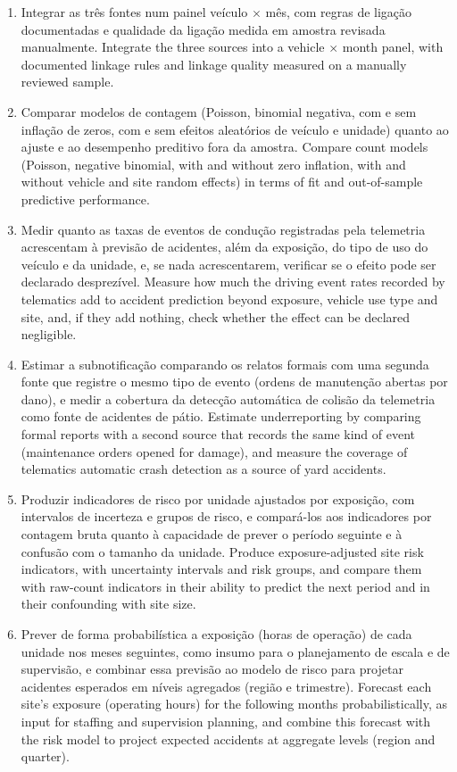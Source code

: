\begin{enumerate}[label=(\alph*)]
  \item \tr%
    {Integrar as três fontes num painel veículo $\times$ mês, com regras de ligação documentadas e qualidade da ligação medida em amostra revisada manualmente.}%
    {Integrate the three sources into a vehicle $\times$ month panel, with documented linkage rules and linkage quality measured on a manually reviewed sample.}
  \item \tr%
    {Comparar modelos de contagem (Poisson, binomial negativa, com e sem inflação de zeros, com e sem efeitos aleatórios de veículo e unidade) quanto ao ajuste e ao desempenho preditivo fora da amostra.}%
    {Compare count models (Poisson, negative binomial, with and without zero inflation, with and without vehicle and site random effects) in terms of fit and out-of-sample predictive performance.}
  \item \tr%
    {Medir quanto as taxas de eventos de condução registradas pela telemetria acrescentam à previsão de acidentes, além da exposição, do tipo de uso do veículo e da unidade, e, se nada acrescentarem, verificar se o efeito pode ser declarado desprezível.}%
    {Measure how much the driving event rates recorded by telematics add to accident prediction beyond exposure, vehicle use type and site, and, if they add nothing, check whether the effect can be declared negligible.}
  \item \tr%
    {Estimar a subnotificação comparando os relatos formais com uma segunda fonte que registre o mesmo tipo de evento (ordens de manutenção abertas por dano), e medir a cobertura da detecção automática de colisão da telemetria como fonte de acidentes de pátio.}%
    {Estimate underreporting by comparing formal reports with a second source that records the same kind of event (maintenance orders opened for damage), and measure the coverage of telematics automatic crash detection as a source of yard accidents.}
  \item \tr%
    {Produzir indicadores de risco por unidade ajustados por exposição, com intervalos de incerteza e grupos de risco, e compará-los aos indicadores por contagem bruta quanto à capacidade de prever o período seguinte e à confusão com o tamanho da unidade.}%
    {Produce exposure-adjusted site risk indicators, with uncertainty intervals and risk groups, and compare them with raw-count indicators in their ability to predict the next period and in their confounding with site size.}
  \item \textit{} \tr%
    {Prever de forma probabilística a exposição (horas de operação) de cada unidade nos meses seguintes, como insumo para o planejamento de escala e de supervisão, e combinar essa previsão ao modelo de risco para projetar acidentes esperados em níveis agregados (região e trimestre).}%
    {Forecast each site's exposure (operating hours) for the following months probabilistically, as input for staffing and supervision planning, and combine this forecast with the risk model to project expected accidents at aggregate levels (region and quarter).}
\end{enumerate}

